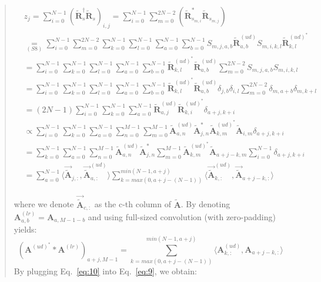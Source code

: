 \documentclass[12pt]{article}
\newenvironment{ourresponse}
    {\begin{tcolorbox}[width=\linewidth,breakable,enhanced,colback=gray!5,colframe=responsecolor!50,title=Response,left=5pt,right=5pt]}
    {\end{tcolorbox}}
\begin{document}
\begin{enumerate}[label=\arabic*.]
\begin{ourresponse}
\begin{quote}
            \begin{align}
            & z_j = \sum^{N-1}_{i=0}(\tilde{\textbf{R}}^{\dagger}_{s}\tilde{\textbf{R}}_{s})_{i,j} = \sum^{N-1}_{i=0} \sum^{2N-2}_{m=0}(\tilde{\textbf{R}}^{*}_{s_{m,i}}\tilde{\textbf{R}}_{s_{m,j}}) \nonumber &\\&\underset{(S8)}{=}  \sum^{N-1}_{i=0}\sum^{2N-2}_{m=0}\sum^{N-1}_{k=0}\sum^{N-1}_{l=0}\sum^{N-1}_{a=0}\sum^{N-1}_{b=0}S_{m,j,a,b}\tilde{\textbf{R}}^{(ud)}_{a,b}S_{m,i,k,l}\tilde{\textbf{R}}^{(ud)^*}_{k,l} \nonumber &\\ 
            &= \sum^{N-1}_{i=0}\sum^{N-1}_{k=0}\sum^{N-1}_{l=0}\sum^{N-1}_{a=0}\sum^{N-1}_{b=0}\tilde{\textbf{R}}^{(ud)^*}_{k,l}\tilde{\textbf{R}}^{(ud)}_{a,b}\sum^{2N-2}_{m=0}S_{m,j,a,b}S_{m,i,k,l} \nonumber &\\ 
            &= \sum^{N-1}_{i=0}\sum^{N-1}_{k=0}\sum^{N-1}_{l=0}\sum^{N-1}_{a=0}\sum^{N-1}_{b=0}\tilde{\textbf{R}}^{(ud)^*}_{k,l}\tilde{\textbf{R}}^{(ud)}_{a,b}\delta_{j,b}\delta_{i,l}\sum^{2N-2}_{m=0}\delta_{m,a+b}\delta_{m,k+l} \nonumber &\\ 
            &= (2N-1)\sum^{N-1}_{i=0}\sum^{N-1}_{k=0}\sum^{N-1}_{a=0}\tilde{\textbf{R}}^{(ud)}_{a,j}\tilde{\textbf{R}}^{(ud)^*}_{k,i}\delta_{a+j,k+i} \nonumber &\\ 
            &\propto \sum^{N-1}_{i=0}\sum^{N-1}_{k=0}\sum^{N-1}_{a=0}\sum^{M-1}_{n=0}\sum^{M-1}_{m=0}\tilde{\textbf{A}}^{(ud)}_{a,n}\tilde{\textbf{A}}^*_{j,n}\tilde{\textbf{A}}^{(ud)^*}_{k,m}\tilde{\textbf{A}}_{i,m}\delta_{a+j,k+i} \nonumber &\\ 
            &= \sum^{N-1}_{k=0}\sum^{N-1}_{a=0}\sum^{M-1}_{n=0}\tilde{\textbf{A}}^{(ud)}_{a,n}\tilde{\textbf{A}}^*_{j,n}\sum^{M-1}_{m=0}\tilde{\textbf{A}}^{(ud)^*}_{k,m}\tilde{\textbf{A}}_{a+j-k,m}\sum^{N-1}_{i=0}\delta_{a+j,k+i}
             \nonumber &\\ 
            &= \sum^{N-1}_{a=0}\langle \vec{\tilde{\textbf{A}}}_{j,:},\vec{\tilde{\textbf{A}}}^{(ud)}_{a,:} \rangle\sum^{min(N-1,a+j)}_{k=max(0,a+j-(N-1))}\langle \vec{\tilde{\textbf{A}}}^{(ud)}_{k,:},\vec{\tilde{\textbf{A}}}_{a+j-k,:} \rangle &
            \tag{S9}
            \label{eq:9}
            \end{align}
            
            where we denote $\vec{\tilde{\textbf{A}}}_{c,:}$ as the c-th column of $\tilde{\textbf{A}}$. By denoting ${\textbf{A}}^{(lr)}_{a,b}={\textbf{A}}_{a,M-1-b}$ and using full-sized convolution (with zero-padding) yields:
            \begin{equation}
            ({\textbf{A}}^{(ud)^*}*{\textbf{A}}^{(lr)})_{a+j,M-1} = \sum^{min(N-1,a+j)}_{k=max(0,a+j-(N-1))}\langle {\textbf{A}}^{(ud)}_{k,:},{\textbf{A}}_{a+j-k,:} \rangle \label{eq:10} \tag{S10}
            \end{equation}
            By plugging Eq.~\ref{eq:10} into Eq.~\ref{eq:9}, we obtain:
            

\end{quote}
\end{ourresponse}
\end{enumerate}
\end{document}

